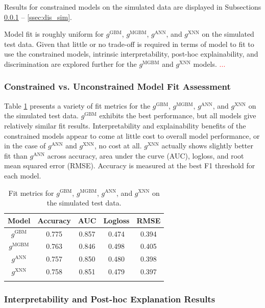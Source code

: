 \documentclass[information,article,submit,moreauthors,pdftex]{definitions/mdpi}
\begin{document}
Results for constrained models on the simulated data are displayed in Subsections \ref{ssec: c_v_uc_sim} -- \ref{ssec:dis_sim}. {Model fit is roughly uniform for $g^\text{GBM}$, $g^\text{MGBM}$, $g^\text{ANN}$, and $g^\text{XNN}$ on the simulated test data. Given that little or no trade-off is required in terms of model to fit to use the constrained models, intrinsic interpretability, post-hoc explainability, and discrimination are explored further for the $g^\text{MGBM}$ and $g^\text{XNN}$ models. \textcolor{red}{...}

\subsubsection{Constrained vs. Unconstrained Model Fit Assessment}\label{ssec: c_v_uc_sim}

Table \ref{tab:sim_acc} presents a variety of fit metrics for the $g^\text{GBM}$, $g^\text{MGBM}$, $g^\text{ANN}$, and $g^\text{XNN}$ on the simulated test data. $g^\text{GBM}$ exhibits the best performance, but all models give relatively similar fit results. Interpretability and explainability benefits of the constrained models appear to come at little cost to overall model performance, or in the case of $g^\text{ANN}$ and $g^\text{XNN}$, no cost at all. $g^\text{XNN}$ actually shows slightly better fit than $g^\text{ANN}$ across accuracy, area under the curve (AUC), logloss, and root mean squared error (RMSE). Accuracy is measured at the best F1 threshold for each model.

\begin{table}[H]
\caption{Fit metrics for $g^\text{GBM}$, $g^\text{MGBM}$, $g^\text{ANN}$, and $g^\text{XNN}$ on the simulated test data.}
\centering
\begin{tabular}{ccccc}
\toprule
\textbf{Model}		& \textbf{Accuracy}	& \textbf{AUC}	 & \textbf{Logloss}	& \textbf{RMSE}\\
\midrule
$g^\text{GBM}$		& 0.775	& 0.857	& 0.474	& 0.394 \\
$g^\text{MGBM}$		& 0.763	& 0.846	& 0.498	& 0.405 \\
$g^\text{ANN}$		& 0.757	& 0.850	& 0.480 & 0.398 \\
$g^\text{XNN}$		& 0.758	& 0.851	& 0.479	& 0.397 \\
\bottomrule
\label{tab:sim_acc}
\end{tabular}
\end{table}

\subsubsection{Interpretability and Post-hoc Explanation Results}\label{ssec:int_ex_sim}

}
\end{document}
